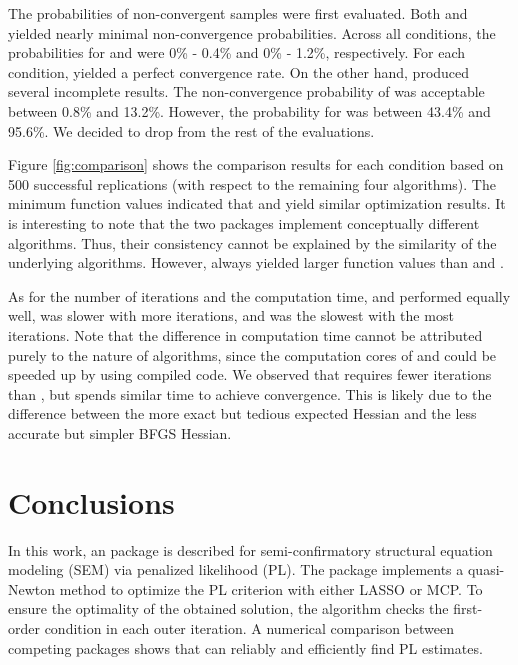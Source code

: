 \documentclass[nojss]{jss}
\begin{document}
The probabilities of non-convergent samples were first evaluated. Both  and  yielded nearly minimal non-convergence probabilities. Across all conditions, the probabilities for  and  were 0\% - 0.4\% and 0\% - 1.2\%, respectively. For each condition,  yielded a perfect convergence rate. On the other hand,  produced several incomplete results. The non-convergence probability of  was acceptable between 0.8\% and 13.2\%. However, the probability for  was between 43.4\% and 95.6\%. We decided to drop  from the rest of the evaluations.

Figure \ref{fig:comparison} shows the comparison results for each condition based on 500 successful replications (with respect to the remaining four algorithms). The minimum function values indicated that  and  yield similar optimization results. It is interesting to note that the two packages implement conceptually different algorithms. Thus, their consistency cannot be explained by the similarity of the underlying algorithms. However,  always yielded larger function values than  and . 

As for the number of iterations and the computation time,  and  performed equally well,  was slower with more iterations, and  was the slowest with the most iterations. Note that the difference in computation time cannot be attributed purely to the nature of algorithms, since the computation cores of  and  could be speeded up by using compiled code. We observed that  requires fewer iterations than , but spends similar time to achieve convergence. This is likely due to the difference between the more exact but tedious expected Hessian and the less accurate but simpler BFGS Hessian. 

\section{Conclusions} \label{sec:conclusion}
In this work, an  package  is described for semi-confirmatory structural equation modeling (SEM) via penalized likelihood (PL). The package implements a quasi-Newton method to optimize the PL criterion with either LASSO or MCP. To ensure the optimality of the obtained solution, the algorithm checks the first-order condition in each outer iteration. A numerical comparison between competing packages shows that  can reliably and efficiently find PL estimates.
\end{document}
